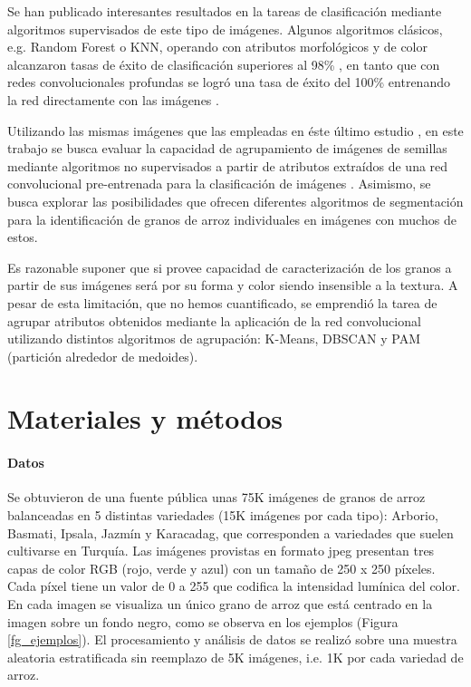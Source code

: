 \documentclass{article}
\begin{document}
Se han publicado interesantes resultados en la tareas de clasificación mediante algoritmos supervisados de este tipo de imágenes.
Algunos algoritmos clásicos, e.g. Random Forest o KNN, operando con atributos morfológicos y de color alcanzaron tasas de éxito de clasificación superiores al 98\% \cite{murat_kuklu_rice_2022}, en tanto que con redes convolucionales profundas se logró una tasa de éxito del 100\% entrenando la red directamente con las imágenes \cite{koklu_classification_2021}.

Utilizando las mismas imágenes que las empleadas en éste último estudio \cite{koklu_classification_2021}, en este trabajo se busca evaluar la capacidad de agrupamiento de imágenes de semillas mediante algoritmos no supervisados a partir de atributos extraídos de una red convolucional pre-entrenada para la clasificación de imágenes \cite{simonyan_very_2015}.
Asimismo, se busca explorar las posibilidades que ofrecen diferentes algoritmos de segmentación para la identificación de granos de arroz individuales en imágenes con muchos de estos.

Es razonable suponer que si provee capacidad de caracterización de los granos a partir de sus imágenes será por su forma y color siendo insensible a la textura.
A pesar de esta limitación, que no hemos cuantificado, se emprendió la tarea de agrupar atributos obtenidos mediante la aplicación de la red convolucional utilizando distintos algoritmos de agrupación: K-Means, DBSCAN y PAM (partición alrededor de medoides). 


\section{Materiales y métodos}

\paragraph{Datos}
Se obtuvieron de una fuente pública \cite{murat_kuklu_rice_2022} unas 75K imágenes de granos de arroz balanceadas en 5 distintas variedades (15K imágenes por cada tipo): Arborio, Basmati, Ipsala, Jazmín y Karacadag, que corresponden a variedades que suelen cultivarse en Turquía.
Las imágenes provistas en formato jpeg presentan tres capas de color RGB (rojo, verde y azul) con un tamaño de 250 x 250 píxeles.
Cada píxel tiene un valor de 0 a 255 que codifica la intensidad lumínica del color.
En cada imagen se visualiza un único grano de arroz que está centrado en la imagen sobre un fondo negro, como se observa en los ejemplos (Figura \ref{fg_ejemplos}).
El procesamiento y análisis de datos se realizó sobre una muestra aleatoria estratificada sin reemplazo de 5K imágenes, i.e. 1K por cada variedad de arroz. 
\end{document}
